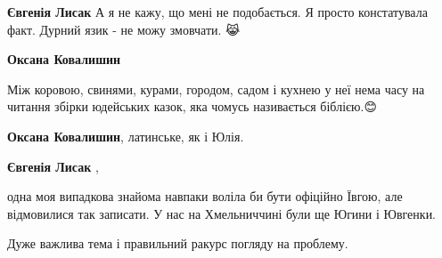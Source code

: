 \begin{itemize}
\begin{itemize}
\textbf{Євгенія Лисак} А я не кажу, що мені не подобається. Я просто констатувала факт. Дурний язик - не можу змовчати. 😹

 
\textbf{Оксана Ковалишин} 

Між коровою, свинями, курами, городом, садом і кухнею у неї нема часу на читання
збірки юдейських казок, яка чомусь називається біблією.😊


 
\textbf{Оксана Ковалишин}, латинське, як і Юлія.

 
\textbf{Євгенія Лисак} , 

одна моя випадкова знайома навпаки воліла би бути офіційно Ївгою, але
відмовилися так записати. У нас на Хмельниччині були ще Югини і Ювгенки.

\end{itemize}

 
Дуже важлива тема і правильний ракурс погляду на проблему.

 


\end{itemize}
